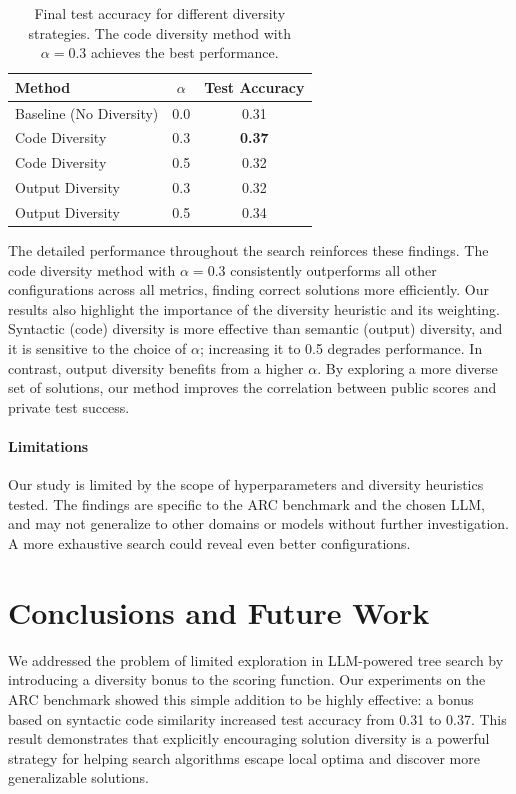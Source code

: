 \documentclass{article} %
\begin{document}
\begin{table}[h]
\caption{Final test accuracy for different diversity strategies. The code diversity method with $\alpha=0.3$ achieves the best performance.}
\label{tab:results_summary}
\centering
\begin{tabular}{lcc}
\toprule
\textbf{Method} & \textbf{$\alpha$} & \textbf{Test Accuracy} \\
\midrule
Baseline (No Diversity) & 0.0 & 0.31 \\
\rowcolor[gray]{0.9}
Code Diversity & 0.3 & \textbf{0.37} \\
Code Diversity & 0.5 & 0.32 \\
Output Diversity & 0.3 & 0.32 \\
Output Diversity & 0.5 & 0.34 \\
\bottomrule
\end{tabular}
\end{table}

The detailed performance throughout the search reinforces these findings. The code diversity method with $\alpha=0.3$ consistently outperforms all other configurations across all metrics, finding correct solutions more efficiently. Our results also highlight the importance of the diversity heuristic and its weighting. Syntactic (code) diversity is more effective than semantic (output) diversity, and it is sensitive to the choice of $\alpha$; increasing it to 0.5 degrades performance. In contrast, output diversity benefits from a higher $\alpha$. By exploring a more diverse set of solutions, our method improves the correlation between public scores and private test success.

\paragraph{Limitations} Our study is limited by the scope of hyperparameters and diversity heuristics tested. The findings are specific to the ARC benchmark and the chosen LLM, and may not generalize to other domains or models without further investigation. A more exhaustive search could reveal even better configurations.


\section{Conclusions and Future Work}
\label{sec:conclusion}
We addressed the problem of limited exploration in LLM-powered tree search by introducing a diversity bonus to the scoring function. Our experiments on the ARC benchmark showed this simple addition to be highly effective: a bonus based on syntactic code similarity increased test accuracy from 0.31 to 0.37. This result demonstrates that explicitly encouraging solution diversity is a powerful strategy for helping search algorithms escape local optima and discover more generalizable solutions.
\end{document}
